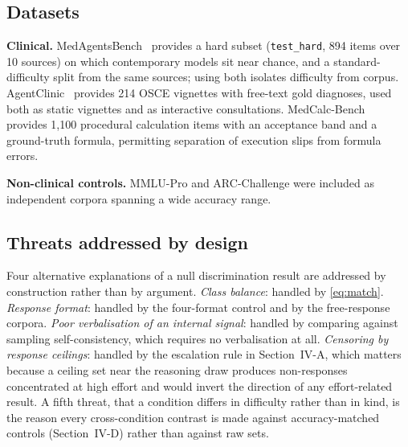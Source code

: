 \documentclass[journal,twoside]{IEEEtran}
\begin{document}
\subsection{Datasets}
\textbf{Clinical.} MedAgentsBench~\cite{medagents} provides a hard subset (\texttt{test\_hard},
894 items over 10 sources) on which contemporary models sit near chance, and a standard-difficulty
split from the same sources; using both isolates difficulty from corpus. AgentClinic~\cite{agentclinic}
provides 214 OSCE vignettes with free-text gold diagnoses, used both as static vignettes and as
interactive consultations. MedCalc-Bench~\cite{medcalc} provides 1{,}100 procedural calculation items
with an acceptance band and a ground-truth formula, permitting separation of execution slips from
formula errors.

\textbf{Non-clinical controls.} MMLU-Pro and ARC-Challenge were included as independent corpora
spanning a wide accuracy range.

\subsection{Threats addressed by design}
Four alternative explanations of a null discrimination result are addressed by construction rather
than by argument. \emph{Class balance}: handled by \eqref{eq:match}. \emph{Response format}: handled
by the four-format control and by the free-response corpora. \emph{Poor verbalisation of an
internal signal}: handled by comparing against sampling self-consistency, which requires no
verbalisation at all. \emph{Censoring by response ceilings}: handled by the escalation rule in
Section~IV-A, which matters because a ceiling set near the reasoning draw produces non-responses
concentrated at high effort and would invert the direction of any effort-related result. A fifth threat, that a
condition differs in difficulty rather than in kind, is the reason every cross-condition contrast is
made against accuracy-matched controls (Section~IV-D) rather than against raw sets.

\begin{table}[!htb]
\caption{Models evaluated. Vendor, scale and architecture are varied so that a condition effect
cannot be attributed to any one of them. Operating points are those surviving the separation test of
Section~IV-B.}
\label{tab:models}
\centering
\small
{}
\end{table}
\end{document}

